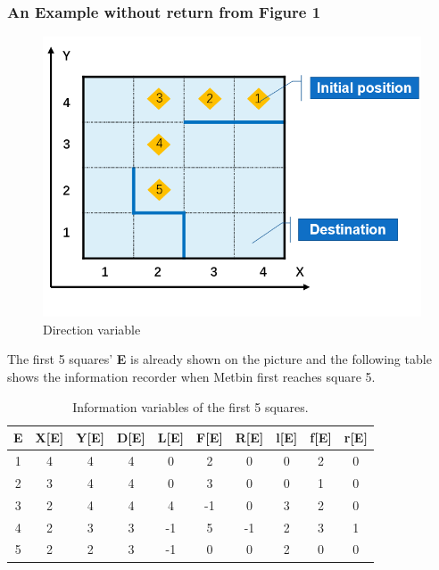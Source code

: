 \documentclass[12pt]{article}
\begin{document}
\subsubsection{An Example without return from Figure 1}
\begin{figure}[H]
\centering
\includegraphics[scale=0.4]{P3.jpg}
\caption{Direction variable}
\end{figure}
The first 5 squares' \textbf{E} is already shown on the picture and the following table shows the information recorder when Metbin first reaches square 5.
\begin{table}[H]
\centering
\begin{tabular}{|c|c|c|c|c|c|c|c|c|c|}
\hline
\textbf{E}&\textbf{X[E]}&\textbf{Y[E]}&\textbf{D[E]}&\textbf{L[E]}&\textbf{F[E]}&\textbf{R[E]}&\textbf{l[E]}&\textbf{f[E]}&\textbf{r[E]}\\ \hline
1 &4  &4  &4  &0 &2 &0 &0 &2 &0  \\ \hline
2 &3  &4  &4  &0 &3 &0 &0 &1 &0  \\ \hline
3 &2  &4  &4  &4 &-1&0 &3 &2 &0  \\ \hline
4 &2  &3  &3  &-1&5&-1 &2 &3 &1 \\ \hline
5 &2  &2  &3  &-1&0&0  &2 &0 &0 \\ \hline
\end{tabular}
\caption{Information variables of the first 5 squares.}
\end{table}
\end{document}
